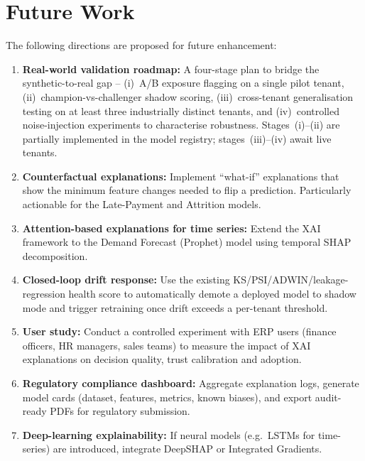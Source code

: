 \documentclass[12pt,a4paper]{report}
\begin{document}
\section{Future Work}
\label{sec:future_work}

The following directions are proposed for future enhancement:

\begin{enumerate}[label=\arabic*.]
  \item \textbf{Real-world validation roadmap:} A four-stage plan to bridge the synthetic-to-real gap -- (i)~A/B exposure flagging on a single pilot tenant, (ii)~champion-vs-challenger shadow scoring, (iii)~cross-tenant generalisation testing on at least three industrially distinct tenants, and (iv)~controlled noise-injection experiments to characterise robustness. Stages~(i)--(ii) are partially implemented in the model registry; stages~(iii)--(iv) await live tenants.

  \item \textbf{Counterfactual explanations:} Implement ``what-if'' explanations that show the minimum feature changes needed to flip a prediction. Particularly actionable for the Late-Payment and Attrition models.

  \item \textbf{Attention-based explanations for time series:} Extend the XAI framework to the Demand Forecast (Prophet) model using temporal SHAP decomposition.

  \item \textbf{Closed-loop drift response:} Use the existing KS/PSI/ADWIN/leakage-regression health score to automatically demote a deployed model to shadow mode and trigger retraining once drift exceeds a per-tenant threshold.

  \item \textbf{User study:} Conduct a controlled experiment with ERP users (finance officers, HR managers, sales teams) to measure the impact of XAI explanations on decision quality, trust calibration and adoption.

  \item \textbf{Regulatory compliance dashboard:} Aggregate explanation logs, generate model cards (dataset, features, metrics, known biases), and export audit-ready PDFs for regulatory submission.

  \item \textbf{Deep-learning explainability:} If neural models (e.g.\ LSTMs for time-series) are introduced, integrate DeepSHAP or Integrated Gradients.
\end{enumerate}
\end{document}
